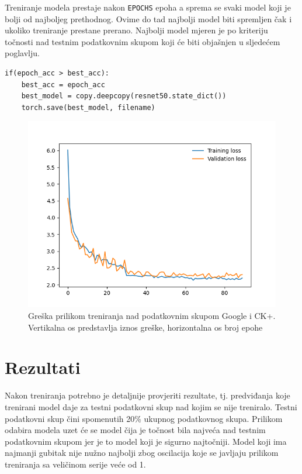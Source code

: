\documentclass[times, utf8, zavrsni,numeric,pstricks]{fer}
\begin{document}
Treniranje modela prestaje nakon \lstinline"EPOCHS" epoha a sprema se svaki model koji je bolji od najboljeg prethodnog. Ovime do tad najbolji model biti spremljen čak i ukoliko treniranje prestane prerano. Najbolji model mjeren je po kriteriju točnosti nad testnim podatkovnim skupom koji će biti objašnjen u sljedećem poglavlju.
\begin{Verbatim}[fontsize=\small]
if(epoch_acc > best_acc):
	best_acc = epoch_acc
	best_model = copy.deepcopy(resnet50.state_dict())
	torch.save(best_model, filename)
\end{Verbatim}

\begin{figure}[H]
	\centering
	\includegraphics[width=\linewidth, height=0.3\paperheight, keepaspectratio]{val_ck.png}
	\caption{Greška prilikom treniranja nad podatkovnim skupom Google i CK+. Vertikalna os predstavlja iznos greške, horizontalna os broj epohe}
	\label{loss_ck}
\end{figure}

\chapter{Rezultati}

Nakon treniranja potrebno je detaljnije provjeriti rezultate, tj. predviđanja koje trenirani model daje za testni podatkovni skup nad kojim se nije treniralo. Testni podatkovni skup čini spomenutih 20\% ukupnog podatkovnog skupa. Prilikom odabira modela uzet će se model čija je točnost bila najveća nad testnim podatkovnim skupom jer je to model koji je sigurno najtočniji. Model koji ima najmanji gubitak nije nužno najbolji zbog oscilacija koje se javljaju prilikom treniranja sa veličinom serije veće od 1. 
\end{document}
